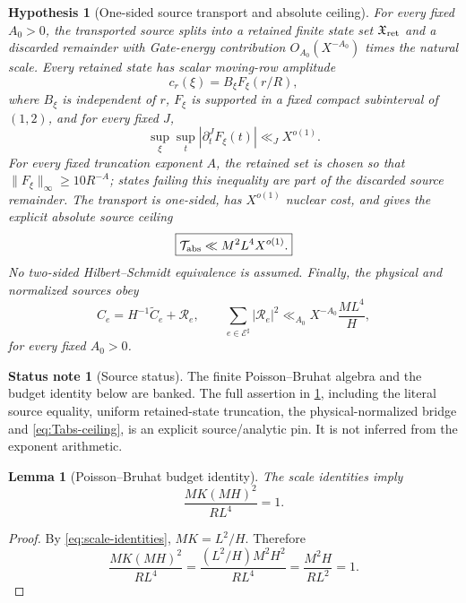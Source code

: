 \documentclass[11pt]{article}
\newtheorem{lemma}[lemma]{Lemma}
\newtheorem{hypothesis}[hypothesis]{Hypothesis}
\theoremstyle{definition}
\newtheorem{status}[status]{Status note}
\newcommand{\1}{\mathbf 1}
\begin{document}
\begin{hypothesis}[One-sided source transport and absolute ceiling]
\label{hyp:PB}
For every fixed $A_0>0$, the transported source splits into a retained finite
state set $\mathfrak X_{\rm ret}$ and a discarded remainder with Gate-energy
contribution $O_{A_0}(X^{-A_0})$ times the natural scale.  Every retained state
has scalar moving-row amplitude
\begin{equation}
   c_r(\xi)=B_{\xi}F_{\xi}(r/R),
   \label{eq:smooth-envelope}
\end{equation}
where $B_{\xi}$ is independent of $r$, $F_{\xi}$ is supported in a fixed compact
subinterval of $(1,2)$, and for every fixed $J$,
\[
   \sup_{\xi}\sup_t |\partial_t^J F_{\xi}(t)|\ll_J X^{o(1)}.
\]
For every fixed truncation exponent $A$, the retained set is chosen so that
$\|F_{\xi}\|_\infty\ge 10R^{-A}$; states failing this inequality are part of
the discarded source remainder.  The transport is one-sided, has $X^{o(1)}$
nuclear cost, and gives the explicit absolute source ceiling
\begin{equation}
   \boxed{\mathcal T_{\rm abs}\ll M^2L^4X^{o(1)}.}
   \label{eq:Tabs-ceiling}
\end{equation}
No two-sided Hilbert--Schmidt equivalence is assumed.  Finally, the physical
and normalized sources obey
\[
   C_e=H^{-1}\widetilde C_e+\mathcal R_e,
   \qquad
   \sum_{e\in\mathcal E^\sharp}|\mathcal R_e|^2
     \ll_{A_0} X^{-A_0}\frac{ML^4}{H},
\]
for every fixed $A_0>0$.
\end{hypothesis}

\begin{status}[Source status]
The finite Poisson--Bruhat algebra and the budget identity below are banked.
The full assertion in \cref{hyp:PB}, including the literal source equality,
uniform retained-state truncation, the physical-normalized bridge and \eqref{eq:Tabs-ceiling}, is an explicit
source/analytic pin.  It is not inferred from the exponent arithmetic.
\end{status}

\begin{lemma}[Poisson--Bruhat budget identity]
\label{lem:PB-budget}
The scale identities imply
\[
   \boxed{\frac{MK(MH)^2}{RL^4}=1.}
\]
\end{lemma}
\begin{proof}
By \eqref{eq:scale-identities}, $MK=L^2/H$.  Therefore
\[
 \frac{MK(MH)^2}{RL^4}
 =\frac{(L^2/H)M^2H^2}{RL^4}
 =\frac{M^2H}{RL^2}=1.
\]
\end{proof}
\end{document}
